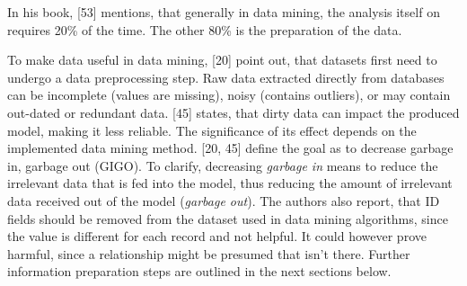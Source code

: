 In his book, \textcite{mccue2014data}[53] mentions, that generally in data mining, the analysis itself on requires 20\% of the time. The other 80\% is the preparation of the data.

To make data useful in data mining, \textcite{DataMiningAndPredictiveAnalytics}[20] point out, that datasets first need to undergo a data preprocessing step. Raw data extracted directly from databases can be incomplete (values are missing), noisy (contains outliers), or may contain out-dated or redundant data. \textcite{dataPreprocessingInDataMining}[45] states, that dirty data can impact the produced model, making it less reliable. The significance of its effect depends on the implemented data mining method. \textcite{DataMiningAndPredictiveAnalytics}[20, 45] define the goal as to decrease garbage in, garbage out (GIGO). To clarify, decreasing \textit{garbage in} means to reduce the irrelevant data that is fed into the model, thus reducing the amount of irrelevant data received out of the model (\textit{garbage out}). The authors also report, that ID fields should be removed from the dataset used in data mining algorithms, since the value is different for each record and not helpful. It could however prove harmful, since a relationship might be presumed that isn't there. Further information preparation steps are outlined in the next sections below.



